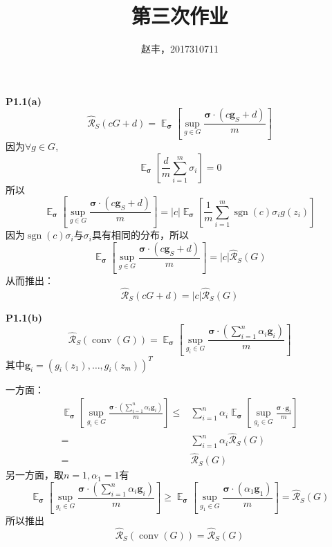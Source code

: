 \documentclass{ctexart}
\DeclareMathOperator*\E{\mathbb{E}}
\DeclareMathOperator\sign{sgn}
\DeclareMathOperator\conv{conv}
\begin{document}
\title{第三次作业}
\author{赵丰，2017310711}
\maketitle
\textbf{P1.1(a)}
\begin{equation}
\hat{\mathcal{R}}_S(cG+d)=\E_{\bm{\sigma}}\left[\sup_{g\in G}\frac{\bm{\sigma}\cdot (c\bm{g}_S+d)}{m}\right]
\end{equation}
因为$\forall g \in G$,
\begin{equation}
\E_{\bm{\sigma}}\left[\frac{d}{m}\sum_{i=1}^m \sigma_i\right]=0
\end{equation}
所以
\begin{equation}
\E_{\bm{\sigma}}\left[\sup_{g\in G}\frac{\bm{\sigma}\cdot (c\bm{g}_S+d)}{m}\right]=
|c|\E_{\bm{\sigma}}\left[\frac{1}{m}\sum_{i=1}^m \sign(c)\sigma_i g(z_i)\right]
\end{equation}
因为$\sign(c)\sigma_i$与$\sigma_i$具有相同的分布，所以
\begin{equation}
\E_{\bm{\sigma}}\left[\sup_{g\in G}\frac{\bm{\sigma}\cdot (c\bm{g}_S+d)}{m}\right]=
|c|\hat{\mathcal{R}}_S(G)
\end{equation}
从而推出：
\begin{equation}
\hat{\mathcal{R}}_S(cG+d)=|c|\hat{\mathcal{R}}_S(G)
\end{equation}

\textbf{P1.1(b)}
\begin{equation}
\hat{\mathcal{R}}_S(\conv(G))=\E_{\bm{\sigma}}\left[\sup_{g_i\in G}\frac{\bm{\sigma}\cdot (\sum_{i=1}^n \alpha_i\bm{g}_i)}{m}\right]
\end{equation}
其中$\bm{g}_i=(g_i(z_1),\dots,g_i(z_m))^T$

一方面：
\begin{align*}
\E_{\bm{\sigma}}\left[\sup_{g_i\in G}\frac{\bm{\sigma}\cdot (\sum_{i=1}^n \alpha_i\bm{g}_i)}{m}\right]\leq &
\sum_{i=1}^n \alpha_i \E_{\bm{\sigma}}\left[\sup_{g_i\in G}\frac{\bm{\sigma}\cdot \bm{g}_i}{m}\right]\\
=& \sum_{i=1}^n \alpha_i \hat{\mathcal{R}}_S(G)\\
=& \hat{\mathcal{R}}_S(G)
\end{align*}
另一方面，取$n=1,\alpha_1=1$有
\begin{equation}
\E_{\bm{\sigma}}\left[\sup_{g_i\in G}\frac{\bm{\sigma}\cdot (\sum_{i=1}^n \alpha_i\bm{g}_i)}{m}\right]\geq 
\E_{\bm{\sigma}}\left[\sup_{g_1\in G}\frac{\bm{\sigma}\cdot (\alpha_1\bm{g}_1)}{m}\right]
= \hat{\mathcal{R}}_S(G)
\end{equation}
所以推出
\begin{equation}
\hat{\mathcal{R}}_S(\conv(G))=\hat{\mathcal{R}}_S(G)
\end{equation}
\end{document}
